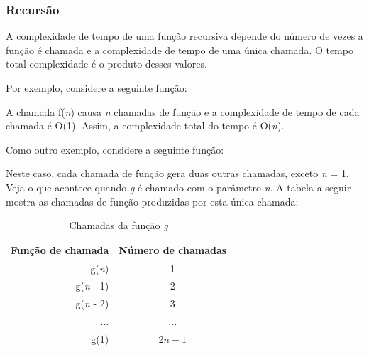 

\subsubsection*{Recursão}

A complexidade de tempo de uma função recursiva depende do número de vezes a função é chamada e a complexidade de tempo de uma única chamada. O tempo total complexidade é o produto desses valores.

Por exemplo, considere a seguinte função:



A chamada f(\textit{n}) causa \textit{n} chamadas de função e a complexidade de tempo de cada chamada é O(1). Assim, a complexidade total do tempo é O(\textit{n}).

Como outro exemplo, considere a seguinte função:



Neste caso, cada chamada de função gera duas outras chamadas, exceto \textit{n} = 1. Veja o que acontece quando \textit{g} é chamado com o parâmetro \textit{n}. A tabela a seguir mostra as chamadas de função produzidas por esta única chamada:


\begin{table}[h!]
   \begin{center}
        \begin{tabular}{rc}
            \textbf{Função de chamada} & \textbf{Número de chamadas}\\ 
            \hline
            g(\textit{n})                       & 1                          \\
            g(\textit{n} - 1)                   & 2                          \\
            g(\textit{n} - 2)                   & 3                            \\
            ...                        & ...                           \\
            g(1)                       &2$n-1$              \\
            \hline
        \end{tabular}
         \caption{Chamadas da função \textit{g}}
         \label{tab:g}
    \end{center}
\end{table}

